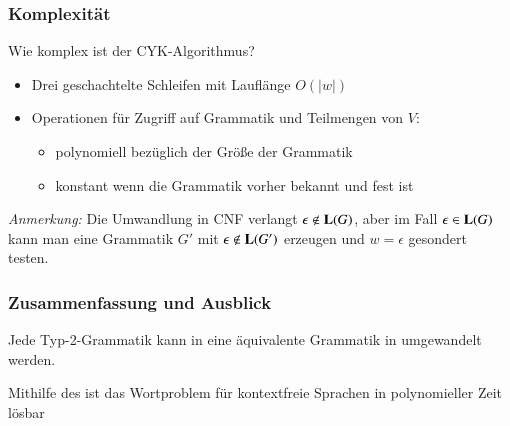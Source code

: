 \documentclass[aspectratio=1610,onlymath]{beamer}
\begin{document}
\begin{frame}\frametitle{Komplexität}

\alert{Wie komplex ist der CYK-Algorithmus?}
\begin{itemize}
\item Drei geschachtelte Schleifen mit Lauflänge $O(|w|)$
\item Operationen für Zugriff auf Grammatik und Teilmengen von $V$:%
\begin{itemize}
\item polynomiell bezüglich der Größe der Grammatik
\item konstant wenn die Grammatik vorher bekannt und fest ist
\end{itemize}
\end{itemize}\bigskip

\bigskip

\emph{Anmerkung:} Die Umwandlung in CNF verlangt $\epsilon\notin\textbf{\textcolor{black}{L}}(G)$, aber 
im Fall $\epsilon\in\textbf{\textcolor{black}{L}}(G)$ kann man eine Grammatik $G'$ mit $\epsilon\notin\textbf{\textcolor{black}{L}}(G')$ erzeugen und
$w=\epsilon$ gesondert testen.

\end{frame}


\begin{frame}\frametitle{Zusammenfassung und Ausblick}

Jede Typ-2-Grammatik kann in eine äquivalente Grammatik in  umgewandelt werden.
\bigskip

Mithilfe des  ist das Wortproblem für kontextfreie Sprachen in polynomieller Zeit lösbar
\bigskip


\end{frame}
\end{document}
